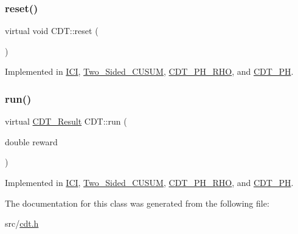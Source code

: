 \subsubsection{\texorpdfstring{reset()}{reset()}}
{\footnotesize\ttfamily virtual void C\+D\+T\+::reset (\begin{DoxyParamCaption}{ }\end{DoxyParamCaption})\hspace{0.3cm}{\ttfamily [pure virtual]}}



Implemented in \mbox{\hyperlink{class_i_c_i_a24fe71d12a6dcb070cb87c342874fd33}{I\+CI}}, \mbox{\hyperlink{class_two___sided___c_u_s_u_m_a566b22cd9f410bc85aad359c4710a603}{Two\+\_\+\+Sided\+\_\+\+C\+U\+S\+UM}}, \mbox{\hyperlink{class_c_d_t___p_h___r_h_o_acd4e4d53cbda5713ac60f07f002ec1c2}{C\+D\+T\+\_\+\+P\+H\+\_\+\+R\+HO}}, and \mbox{\hyperlink{class_c_d_t___p_h_adace7acacaeb66d3d2a292ccb69ac821}{C\+D\+T\+\_\+\+PH}}.

\mbox{\label{class_c_d_t_a2493aeb166403f448ec689d2f7b85dbc}} 
\subsubsection{\texorpdfstring{run()}{run()}}
{\footnotesize\ttfamily virtual \mbox{\hyperlink{class_c_d_t___result}{C\+D\+T\+\_\+\+Result}} C\+D\+T\+::run (\begin{DoxyParamCaption}\item[{double}]{reward }\end{DoxyParamCaption})\hspace{0.3cm}{\ttfamily [pure virtual]}}



Implemented in \mbox{\hyperlink{class_i_c_i_a6a26d0c0a207ddd1f474bbdd226d82c8}{I\+CI}}, \mbox{\hyperlink{class_two___sided___c_u_s_u_m_a6b6bb55a881148cb4e969b0fbf186315}{Two\+\_\+\+Sided\+\_\+\+C\+U\+S\+UM}}, \mbox{\hyperlink{class_c_d_t___p_h___r_h_o_a8c66d0d856204b5368e5b6cba989b0d7}{C\+D\+T\+\_\+\+P\+H\+\_\+\+R\+HO}}, and \mbox{\hyperlink{class_c_d_t___p_h_a58f56f0997012d0f350cc5721ef8a9e0}{C\+D\+T\+\_\+\+PH}}.



The documentation for this class was generated from the following file\+:\begin{DoxyCompactItemize}
\item 
src/\mbox{\hyperlink{cdt_8h}{cdt.\+h}}\end{DoxyCompactItemize}
